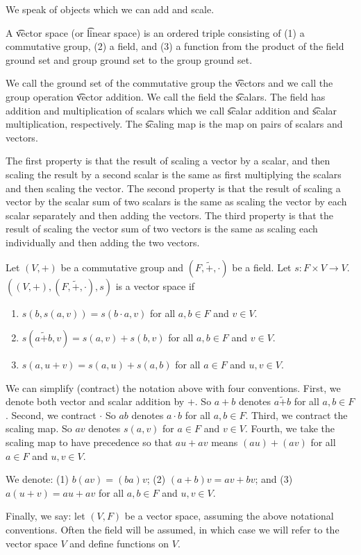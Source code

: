 

We speak of objects which we can add and scale.


A \t{vector space} (or \t{linear space}) is an ordered triple consisting of
(1) a commutative group, (2) a field, and (3) a function from the product of the field ground set and group ground set to the group ground set.

We call the ground set of the commutative group the \t{vectors} and we call the group operation \t{vector addition}.
We call the field the \t{scalars}.
The field has addition and multiplication of scalars which we call \t{scalar addition} and \t{scalar multiplication}, respectively.
The \t{scaling map} is the map on pairs of scalars and vectors.

The first property is that the result of scaling a vector by a scalar, and then scaling the result by a second scalar is the same as first multiplying the scalars and then scaling the vector.
The second property is that the result of scaling a vector by the scalar sum of two scalars is the same as scaling the vector by each scalar separately and then adding the vectors.
The third property is that the result of scaling the vector sum of two vectors is the same as scaling each individually and then adding the two vectors.


Let $(V,+)$ be a commutative group and $(F, \tilde{+}, \cdot)$ be a field.
Let $s: F \times V \to V$.  $((V, +), (F, \tilde{+}, \cdot), s)$ is a vector space if
\begin{enumerate}
  \item $s(b,s(a, v)) = s(b \cdot a, v)$ for all $a, b \in F$ and $v \in V$.
  \item $s(a\tilde{+}b, v) = s(a, v) + s(b, v)$ for all $a, b \in F$ and $v \in V$.
  \item $s(a, u + v) = s(a,u) + s(a, b)$ for all $a \in F$ and $u, v \in V$.
\end{enumerate}

We can simplify (contract) the notation above with four conventions.
First, we denote both vector
and scalar addition by $+$.
So $a + b$ denotes $a \tilde{+} b$
for all $a, b \in F$.
Second,
we contract $\cdot$
So $ab$ denotes $a \cdot b$
for all $a, b \in F$.
Third, we
contract the scaling map.
So $av$ denotes $s(a, v)$
for $a \in F$ and $v \in V$.
Fourth,
we take the scaling
map to have precedence so that
$au + av$ means $(au) + (av)$
for all $a \in F$ and $u,v \in V$.

We denote:
(1)
$b(av) = (ba)v$;
(2)
$(a+b)v = av + bv$;
and (3)
$a(u + v) = au + av$
for all
$a,b \in F$ and $u, v \in V$.

Finally, we say: let $(V, F)$
be a vector space, assuming the
above notational conventions.
Often the field will be assumed, in which case we will refer to the vector space $V$ and define functions on $V$.

